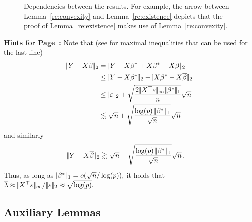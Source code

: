 \documentclass[bj]{imsart}
\newcommand{\normsup}[1]{\ensuremath{\!|\!| #1 | \! |_{\infty}}}
\newcommand{\normone}[1]{\ensuremath{\!|\!| #1 | \! |_{1}}}
\newcommand{\normtwo}[1]{\ensuremath{\!|\!| #1 | \! |_{2}}}
\newcommand{\1}{{\rm 1}\mskip -4,5mu{\rm l} }
\newcommand{\lo}{\overline{\lambda}}
\begin{document}
    
\begin{figure}[h]    
\caption{Dependencies between the results. For example, the arrow between Lemma~\ref{re:convexity} and Lemma~\ref{re:existence} depicts that the proof of Lemma~\ref{re:existence} makes use of Lemma~\ref{re:convexity}.}
\label{fig:dependence}
\end{figure}
{\bf Hints for Page~\pageref{sqrtex}:}\label{sqrtexproof}
Note that (see \cite[Section~2.2]{vanderVaart96} for maximal inequalities that can be used for the last line)
\begin{align*}
\normtwo{\outcome-\design\estimatororacle}
= &\ \normtwo{\outcome-\design\truth+\design\truth-\design\estimatororacle}\\
\le&\ \normtwo{\outcome-\design\truth}+\normtwo{\design\truth-\design\estimatororacle}\\
\le& \ \normtwo{\noise}+\sqrt{\frac{2\,\normsup{\design^\top\noise}\,\normone{\truth}}{n}}\sqrt{n}\\
\lesssim& \ \sqrt{n}+\sqrt{\frac{\log(p)\ \normone{\truth}}{\sqrt n}}\sqrt{n}
\end{align*}
and similarly 
\begin{align*}
\normtwo{\outcome-\design\estimatororacle}
\gtrsim& \ \sqrt{n}-\sqrt{\frac{\log(p)\ \normone{\truth}}{\sqrt n}}\sqrt{n}\,.
\end{align*}
Thus, as long as $\normone{\truth}=o(\sqrt n/\log (p)),$ it holds that $\lo\approx \normsup{\design^\top\noise}/\,\normtwo{\noise}\approx\sqrt{\log(p)}.$ 

\subsection{Auxiliary Lemmas}
\end{document}
